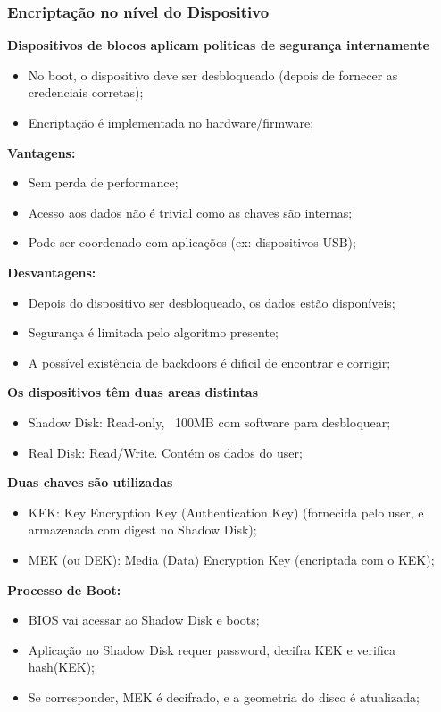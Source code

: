 \documentclass{article}
\begin{document}
\subsubsection{Encriptação no nível do Dispositivo}

\begin{flushleft}
  \textbf{Dispositivos de blocos aplicam politicas de segurança internamente}
  \begin{itemize}
    \item No boot, o dispositivo deve ser desbloqueado (depois de fornecer as credenciais corretas);
    \item Encriptação é implementada no hardware/firmware;
  \end{itemize}

  \pagebreak

  \textbf{Vantagens:}
  \begin{itemize}
    \item Sem perda de performance;
    \item Acesso aos dados não é trivial como as chaves são internas;
    \item Pode ser coordenado com aplicações (ex: dispositivos USB);
  \end{itemize}

  \textbf{Desvantagens:}
  \begin{itemize}
    \item Depois do dispositivo ser desbloqueado, os dados estão disponíveis;
    \item Segurança é limitada pelo algoritmo presente;
    \item A possível existência de backdoors é dificil de encontrar e corrigir;
  \end{itemize}

  \textbf{Os dispositivos têm duas areas distintas}
  \begin{itemize}
    \item Shadow Disk: Read-only, ~100MB com software para desbloquear;
    \item Real Disk: Read/Write. Contém os dados do user;
  \end{itemize}

  \textbf{Duas chaves são utilizadas}
  \begin{itemize}
    \item KEK: Key Encryption Key (Authentication Key) (fornecida
    pelo user, e armazenada com digest no Shadow Disk);
    \item MEK (ou DEK): Media (Data) Encryption Key (encriptada com o KEK);
  \end{itemize}

  \textbf{Processo de Boot:}
  \begin{itemize}
    \item BIOS vai acessar ao Shadow Disk e boots;
    \item Aplicação no Shadow Disk requer password, decifra KEK e verifica hash(KEK);
    \item Se corresponder, MEK é decifrado, e a geometria do disco é atualizada;
  \end{itemize}
\end{flushleft}
\end{document}
